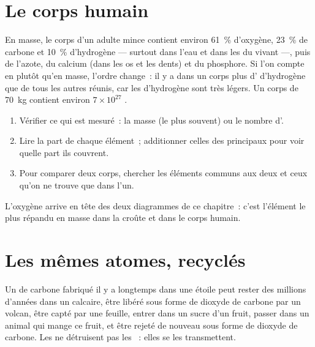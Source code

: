\section{Le corps humain}

\begin{proposition}\label{prop:g9:elements-universe-earth:body}
En masse, le corps d'un adulte mince contient environ \qty{61}{\percent}
d'oxygène, \qty{23}{\percent} de carbone et \qty{10}{\percent}
d'hydrogène --- surtout dans l'eau et dans les  du vivant ---,
puis de l'azote, du calcium (dans les os et les dents) et du phosphore.
Si l'on compte en  plutôt qu'en masse, l'ordre change~: il y a
dans un corps plus d' d'hydrogène que de tous les autres 
réunis, car les  d'hydrogène sont très légers. Un corps de
\qty{70}{kg} contient environ $7 \times 10^{27}$ .
\end{proposition}

\begin{method}\label{met:g9:elements-universe-earth:read}
\begin{enumerate}
  \item Vérifier ce qui est mesuré~: la masse (le plus souvent) ou le
        nombre d'.
  \item Lire la part de chaque élément~; additionner celles des
        principaux pour voir quelle part ils couvrent.
  \item Pour comparer deux corps, chercher les éléments communs aux deux
        et ceux qu'on ne trouve que dans l'un.
\end{enumerate}
L'oxygène arrive en tête des deux diagrammes de ce chapitre~: c'est
l'élément le plus répandu en masse dans la croûte et dans le corps
humain.
\end{method}

\section{Les mêmes atomes, recyclés}

\begin{example}\label{ex:g9:elements-universe-earth:journey}
Un  de carbone fabriqué il y a longtemps dans une étoile peut
rester des millions d'années dans un calcaire, être libéré sous forme de
dioxyde de carbone par un volcan, être capté par une feuille, entrer
dans un sucre d'un fruit, passer dans un animal qui mange ce fruit, et
être rejeté de nouveau sous forme de dioxyde de carbone. Les
 ne détruisent pas les ~: elles se les
transmettent.
\end{example}

